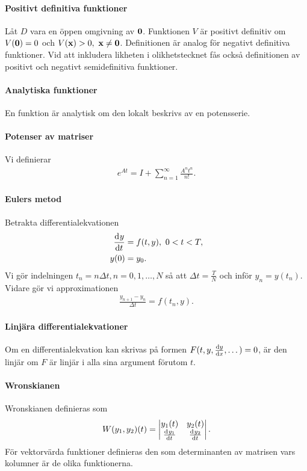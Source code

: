 \paragraph{Positivt definitiva funktioner}
Låt $D$ vara en öppen omgivning av $\vb{0}$. Funktionen $V$ är positivt definitiv om $V(\vb{0}) = 0$ och $V(\vb{x}) > 0,\ \vb{x}\neq\vb{0}$. Definitionen är analog för negativt definitiva funktioner. Vid att inkludera likheten i olikhetstecknet fås också definitionen av positivt och negativt semidefinitiva funktioner.

\paragraph{Analytiska funktioner}
En funktion är analytisk om den lokalt beskrivs av en potensserie.

\paragraph{Potenser av matriser}
Vi definierar
\begin{align*}
	e^{At} = I + \sum\limits_{n = 1}^{\infty}\frac{A^{n}t^{n}}{n!}.
\end{align*}

\paragraph{Eulers metod}
Betrakta differentialekvationen
\begin{align*}
	\dv[]{y}{t} (t) &= f(t, y),\ 0 < t < T, \\
	y(0)             &= y_0.
\end{align*}
Vi gör indelningen $t_n = n\Delta t, n = 0, 1, \dots, N$ så att $\Delta t = \frac{T}{N}$ och inför $y_n = y(t_n)$. Vidare gör vi approximationen
\begin{align*}
	\frac{y_{n + 1} - y_{n}}{\Delta t} = f(t_n, y).
\end{align*}

\paragraph{Linjära differentialekvationer}
Om en differentialekvation kan skrivas på formen $F(t, y, \dv{y}{x}, \dots) = 0$, är den linjär om $F$ är linjär i alla sina argument förutom $t$.

\paragraph{Wronskianen}
Wronskianen definieras som
\begin{align*}
	W(y_1, y_2)(t) = \mdet{y_{1}(t) & y_{2}(t) \\ \deval{y_{1}}{t}{t} & \deval{y_{2}}{t}{t}}.
\end{align*}
För vektorvärda funktioner definieras den som determinanten av matrisen vars kolumner är de olika funktionerna.

